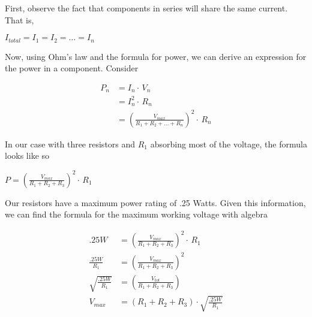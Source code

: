 \documentclass[journal]{IEEEtran}
\begin{document}



First, observe the fact that components in series will share the same current. That is,

\vspace{3mm}
$I_{total}=I_{1}=I_{2}=\dots=I_{n}$
\vspace{3mm}

Now, using Ohm's law and the formula for power, we can derive an expression for the power
in a component. Consider

\begin{align*}
P_{n}&=I_{n}\cdot\,V_{n}\\
&=I_{n}^{2}\cdot\,R_{n}\\
&=\left(\frac{V_{max}}{R_{1}+R_{2}+\dots+R_{n}}\right)^{2}\cdot\,R_{n}
\end{align*}

In our case with three resistors and $R_{1}$ absorbing most of the voltage, the formula
looks like so

\vspace{3mm}
$P=\left(\frac{V_{max}}{R_{1}+R_{2}+R_{3}}\right)^{2}\cdot\,R_{1}$
\vspace{3mm}

Our resistors have a maximum power rating of .25 Watts. Given this information, we can find
the formula for the maximum working voltage with algebra

\begin{align*}
.25W&=\left(\frac{V_{max}}{R_{1}+R_{2}+R_{3}}\right)^{2}\cdot\,R_{1}\\
\frac{.25W}{R_{1}}&=\left(\frac{V_{max}}{R_{1}+R_{2}+R_{3}}\right)^{2}\\
\sqrt{\frac{.25W}{R_{1}}}&=\left(\frac{V_{tot}}{R_{1}+R_{2}+R_{3}}\right)\\
V_{max}&=\left(R_{1}+R_{2}+R_{3}\right)\cdot\sqrt{\frac{.25W}{R_{1}}}
\end{align*}
\end{document}
